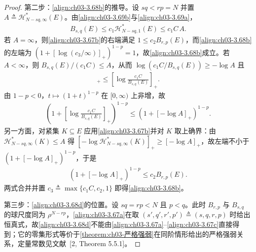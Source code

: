 \documentclass[../../main.tex]{subfiles}%
\begin{document}
\begin{proof}
第二步：\eqref{align:ch03-3.68b}的推导。设 $sq<rp=N$ 并置 $A\triangleq\mathcal{H}^*_{N-sq,\infty}(E)$。由\eqref{align:ch03-3.69b}与\eqref{align:ch03-3.69a}，
\begin{align*}
B_{s,q}(E)\leqslant c_1\mathcal{H}^*_{N-sq,1}(E)\leqslant c_1C\,A.
\end{align*}
若 $A=\infty$，则\eqref{align:ch03-3.67b}的右端满足 $1\leqslant c_2B_{r,p}(E)$，而\eqref{align:ch03-3.68b}的左端为 $(1+[\log(c_3/\infty)]_+)^{1-p}=1$，故\eqref{align:ch03-3.68b}成立。若 $A<\infty$，则 $B_{s,q}(E)/(c_1C)\leqslant A$，从而 $\log(c_1C/B_{s,q}(E))\geqslant-\log A$ 且
\begin{align*}
[-\log A]_+\leqslant\left[\log\frac{c_1C}{B_{s,q}(E)}\right]_+.
\end{align*}
由 $1-p<0$，$t\mapsto(1+t)^{1-p}$ 在 $[0,\infty)$ 上非增，故
\begin{align*}
\left(1+\left[\log\frac{c_1C}{B_{s,q}(E)}\right]_+\right)^{1-p}\leqslant(1+[-\log A]_+)^{1-p}.
\end{align*}
另一方面，对紧集 $K\subseteq E$ 应用\eqref{align:ch03-3.67b}并对 $K$ 取上确界：由 $\mathcal{H}^*_{N-sq,\infty}(K)\leqslant A$ 得 $[-\log\mathcal{H}^*_{N-sq,\infty}(K)]_+\geqslant[-\log A]_+$，故左端不小于 $(1+[-\log A]_+)^{1-p}$，于是
\begin{align*}
(1+[-\log A]_+)^{1-p}\leqslant c_2B_{r,p}(E).
\end{align*}
两式合并并置 $c_3\triangleq\max\{c_1C,c_2,1\}$ 即得\eqref{align:ch03-3.68b}。

第三步：\eqref{align:ch03-3.68d}的位置。设 $sq=rp<N$ 且 $p<q$。此时 $B_{r,p}$ 与 $B_{s,q}$ 的球尺度同为 $\rho^{N-rp}$，\eqref{align:ch03-3.67a}在取 $(s',q',r',p')\triangleq(s,q,r,p)$ 时给出恒真式，故\eqref{align:ch03-3.68d}不能由\eqref{align:ch03-3.67a}--\eqref{align:ch03-3.67c}直接得到；它的零集形式等价于\cref{theorem:ch03-严格强弱}在同阶情形给出的严格强弱关系，定量常数见文献~[2, Theorem 5.5.1]。
\end{proof}
\end{document}
